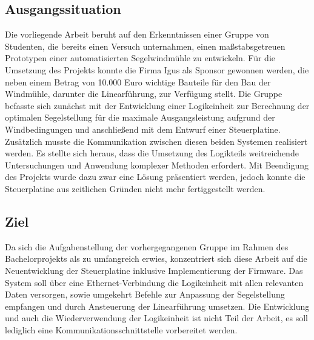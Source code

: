 \subsection{Ausgangssituation}
Die vorliegende Arbeit beruht auf den Erkenntnissen einer Gruppe von Studenten, die bereits einen Versuch unternahmen, einen maßstabsgetreuen Prototypen einer automatisierten Segelwindmühle zu entwickeln. Für die Umsetzung des Projekts konnte die Firma Igus als Sponsor gewonnen werden, die neben einem Betrag von 10.000 Euro wichtige Bauteile für den Bau der Windmühle, darunter die Linearführung, zur Verfügung stellt. Die Gruppe befasste sich zunächst mit der Entwicklung einer Logikeinheit zur Berechnung der optimalen Segelstellung für die maximale Ausgangsleistung aufgrund der Windbedingungen und anschließend mit dem Entwurf einer Steuerplatine. Zusätzlich musste die Kommunikation zwischen diesen beiden Systemen realisiert werden. Es stellte sich heraus, dass die Umsetzung des Logikteils weitreichende Untersuchungen und Anwendung komplexer Methoden erfordert. Mit Beendigung des Projekts wurde dazu zwar eine Lösung präsentiert werden, jedoch konnte die Steuerplatine aus zeitlichen Gründen nicht mehr fertiggestellt werden. 
\subsection{Ziel}
Da sich die Aufgabenstellung der vorhergegangenen Gruppe im Rahmen des Bachelorprojekts als zu umfangreich erwies, konzentriert sich diese Arbeit auf die Neuentwicklung der Steuerplatine inklusive Implementierung der Firmware. Das System soll über eine Ethernet-Verbindung die Logikeinheit mit allen relevanten Daten versorgen, sowie umgekehrt Befehle zur Anpassung der Segelstellung empfangen und durch Ansteuerung der Linearführung umsetzen. Die Entwicklung und auch die Wiederverwendung der Logikeinheit ist nicht Teil der Arbeit, es soll lediglich eine Kommunikationsschnittstelle vorbereitet werden.



